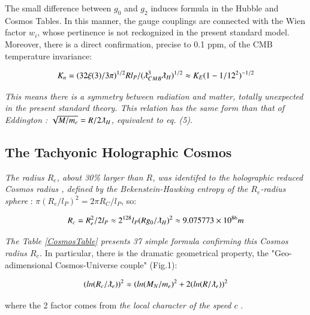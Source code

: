 \documentclass[a4paper,9pt]{article}
\begin{document}
The small difference between $g_0$ and $g_2$ induces formula in the Hubble and Cosmos Tables. In this manner, the gauge couplings are connected with the  Wien factor $w_i$, whose pertinence is not reckognized in the present standard model. Moreover, there is a direct confirmation, precise to 0.1 ppm, of the CMB temperature invariance:

\begin{equation}
K_n = (32 \xi(3) /3\pi)^{1/2} R l_P/(\lambdabar_{CMB}^3 \lambdabar_H)^{1/2} \approx K_E (1-1/12^2)^{-1/2} 
 \end{equation}

\textit{This means there is a symmetry between radiation and matter, totally unexpected in the present standard theory. This relation has the same form than that of Eddington : $\sqrt{M/m_e} = R/2\lambdabar_H$, equivalent to eq. (5)}.

\subsection{The Tachyonic Holographic Cosmos}

\textit {The radius $R_e$, about 30\% larger than $R$, was identifed to the holographic reduced Cosmos radius \cite{Sanchez3}, defined by the Bekenstein-Hawking entropy of the $R_e$-radius sphere} \cite{Bekenstein}: $\pi (R_e/l_P)^2 = 2\pi R_C/l_P$, so:   

 \begin{equation}
R_c = R_e^2/2l_P \approx 2^{128} l_P (Rg_0/ \lambdabar_H)^2 \approx 9.075773 \times 10^{86} m 
 \end{equation}
 
 \textit{The Table \ref{CosmosTable} presents 37 simple formula confirming this Cosmos radius $R_c$.} In particular, there is the dramatic geometrical property, the "Geo-adimensional Cosmos-Universe couple" (Fig.1): 

\begin{equation}
(ln(R_c/\lambdabar_e))^2 \approx (ln(M_N/m_e)^2 + 2(ln(R/\lambdabar_e))^2
\end{equation}

where the 2 factor comes from \textit{the local character of the speed $c$} \cite{Sanchez2}. 
\end{document}
